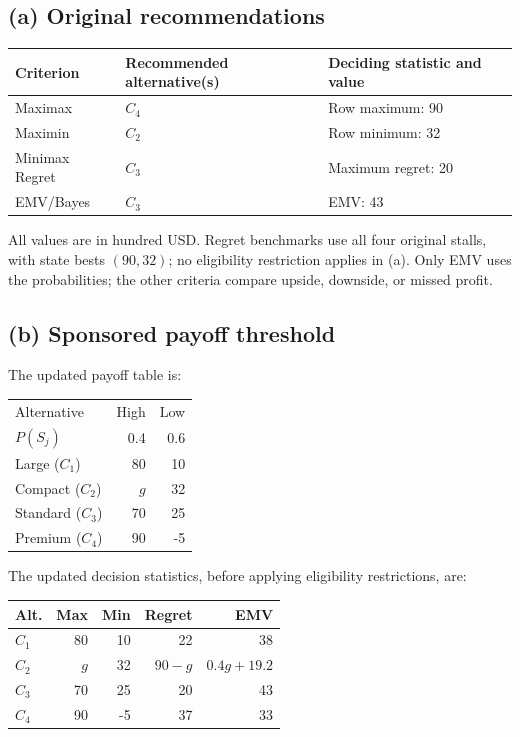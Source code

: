\subsection*{(a) Original recommendations }
\begin{center}
\begin{tabular}{lll}\toprule
Criterion & Recommended alternative(s) & Deciding statistic and value\\ \midrule
Maximax & $C_4$ & Row maximum: 90\\
Maximin & $C_2$ & Row minimum: 32\\
Minimax Regret & $C_3$ & Maximum regret: 20\\
EMV/Bayes & $C_3$ & EMV: 43\\
\bottomrule\end{tabular}
\end{center}
All values are in hundred USD. Regret benchmarks use all four original stalls, with state bests $(90,32)$; no eligibility restriction applies in (a). Only EMV uses the probabilities; the other criteria compare upside, downside, or missed profit.
\secInicio[sec:q2]



\label{sol:q2b}
\subsection*{(b) Sponsored payoff threshold }

The updated payoff table is:

\begin{center}\small\setlength{\tabcolsep}{4pt}
	\begin{tabular}{lrr}\toprule
		Alternative & High & Low\\
		$P(S_j)$ & 0.4 & 0.6\\ \midrule
		Large ($C_1$) & 80 & 10\\
		Compact ($C_2$) & $g$ & 32\\
		Standard ($C_3$) & 70 & 25\\
		Premium ($C_4$) & 90 & -5\\
		\bottomrule
	\end{tabular}
\end{center}

The updated decision statistics, before applying
eligibility restrictions, are:

\begin{center}\small\setlength{\tabcolsep}{4pt}
	\begin{tabular}{lrrrr}\toprule
		Alt. & Max & Min & Regret & EMV\\ \midrule
		$C_1$ & 80 & 10 & 22 & 38\\
		$C_2$ & $g$ & 32 & $90-g$ & $0.4g+19.2$\\
		$C_3$ & 70 & 25 & 20 & 43\\
		$C_4$ & 90 & -5 & 37 & 33\\
		\bottomrule
	\end{tabular}
\end{center}


